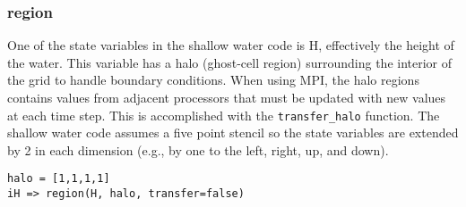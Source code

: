 \subsubsection{region}

One of the state variables in the shallow water code is H, effectively the
height of the water.  This variable has a halo (ghost-cell region) surrounding
the interior of the grid to handle boundary conditions.  When using
MPI, the halo regions contains values from adjacent processors that must be
updated with new values at each time step.  This is accomplished with the
{\tt transfer\_halo} function.  The shallow water code assumes a five point stencil
so the state variables are extended by 2 in each dimension (e.g., by one to the
left, right, up, and down).

\begin{verbatim}
halo = [1,1,1,1]
iH => region(H, halo, transfer=false)
\end{verbatim}
